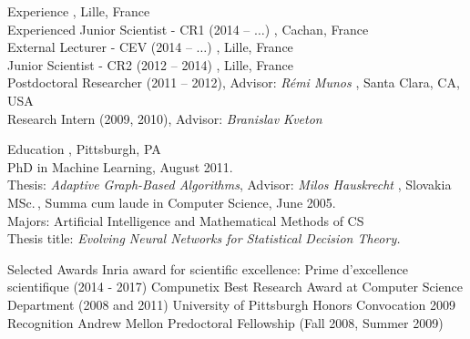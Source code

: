 \documentclass{resume}
\begin{document}
\maketitle



\begin{category}{Experience}
, Lille, France \\
Experienced Junior Scientist - CR1 (2014 -- $\dots$)
, Cachan, France \\
External Lecturer - CEV (2014 -- $\dots$)
, Lille, France \\
Junior Scientist - CR2 (2012 -- 2014)
, Lille, France \\
Postdoctoral Researcher (2011 -- 2012), Advisor:  \emph{R\'emi Munos}
,  Santa Clara, CA, USA\\
Research Intern (2009, 2010), Advisor:  \emph{Branislav Kveton}

\end{category}
\begin{category}{Education}
, Pittsburgh, PA \\ %
PhD in Machine Learning, August 2011.\\
Thesis: \emph{Adaptive Graph-Based Algorithms}, Advisor: \emph{Milos Hauskrecht}
, Slovakia\\%
MSc.\,, Summa cum laude in Computer Science, June 2005.\\
Majors: Artificial Intelligence  and Mathematical Methods of CS\\ %
Thesis title: \emph{Evolving Neural Networks for Statistical Decision Theory.}
\end{category}
\begin{category}{Selected Awards}
	\citemnobullet Inria award for scientific excellence:
Prime d'excellence scientifique (2014 - 2017)
	\citemnobullet Compunetix Best Research Award at Computer Science 
Department (2008 
and 2011)	
	\citemnobullet University of Pittsburgh Honors Convocation 2009 
Recognition 
       \citemnobullet Andrew Mellon Predoctoral Fellowship (Fall 2008, Summer 
2009)	
\end{category}
\end{document}
